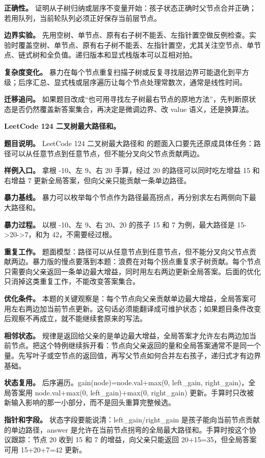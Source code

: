 \textbf{正确性。} 证明从子树归纳或层序不变量开始：孩子状态正确时父节点合并正确；若用队列，当前轮队列必须正好保存当前层节点。

\textbf{边界实验。} 先用空树、单节点、原有右子树不能丢、左指针置空做反例检查。实验时覆盖空树、单节点、原有右子树不能丢、左指针置空，尤其关注空节点、单节点、链式树和全负值。递归版本和显式栈版本可以互相对拍。

\textbf{复杂度变化。} 暴力在每个节点重复扫描子树或反复寻找层边界可能退化到平方级；后序汇总、显式栈或层序遍历让每个节点处理常数次，通常是线性时间。

\textbf{迁移追问。} 如果题目改成“也可用寻找左子树最右节点的原地方法”，先判断原状态是否仍然覆盖新答案集合，再决定是微调边界、改 value 语义，还是换算法。

\noindent\textbf{LeetCode 124 二叉树最大路径和。}

\textbf{题目说明。} LeetCode 124 二叉树最大路径和 的题面入口要先还原成具体任务：路径可以从任意节点到任意节点，但不能分叉向父节点贡献两边。

\textbf{样例入口。} 拿根 -10、左 9、右 20 手算，经过 20 的路径可以同时吃左增益 15 和右增益 7 更新全局答案，但向父亲只能贡献一条单边路径。

\textbf{暴力基线。} 暴力可以枚举每个节点作为路径最高拐点，再分别求左右两侧向下最大路径和。

\textbf{暴力过程。} 以根 -10、左 9、右 20、20 的孩子 15 和 7 为例，最大路径是 15->20->7，和为 42，不需要经过根。

\textbf{重复工作。} 题面模型：路径可以从任意节点到任意节点，但不能分叉向父节点贡献两边。暴力版的慢点要落到本题：浪费在对每个拐点重复求子树贡献。每个节点只需要向父亲返回一条单边最大增益，同时用左右两边更新全局答案。后面的优化只消掉这类重复工作，不能改变答案集合。

\textbf{优化条件。} 本题的关键观察是：每个节点向父亲贡献单边最大增益，全局答案可用左右两边加当前节点更新。这句话必须能翻译成可维护状态；如果题目条件改变后观察不再成立，就不能继续套原来的写法。

\textbf{相邻状态。} 规律是返回给父亲的是单边最大增益，全局答案才允许左右两边加当前节点。把这个特例继续拆开看：节点向父亲返回的量和全局答案通常不是同一个量。先写叶子或空节点的返回值，再写父节点如何合并左右孩子，递归式才有边界基础。

\textbf{状态复用。} 后序遍历。gain(node)=node.val+max(0, left\_gain, right\_gain)，全局答案用 node.val+max(0, left\_gain)+max(0, right\_gain) 更新。手算时只改被新输入影响的那一小部分，而不是回头重算完整候选。

\textbf{指针和字段。} 状态字段要能说清：left\_gain/right\_gain 是孩子能向当前节点贡献的单边路径，answer 是允许在当前节点拐弯的全局最大路径和。手算时按这个协议跟踪：节点 20 收到 15 和 7 的增益，向父亲只能返回 20+15=35，但全局答案可用 15+20+7=42 更新。

